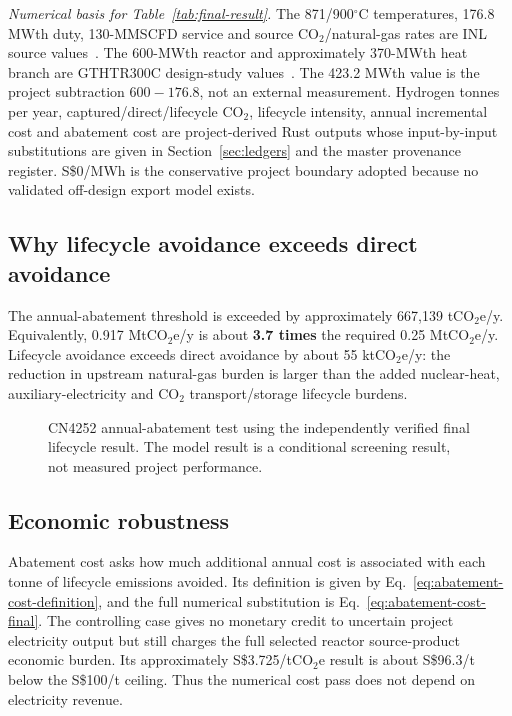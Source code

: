 \noindent\textit{Numerical basis for Table~\ref{tab:final-result}.} The 871/900$^\circ$C temperatures, 176.8 MWth duty, 130-MMSCFD service and source CO$_2$/natural-gas rates are INL source values~\cite{inltev953,inltev961}. The 600-MWth reactor and approximately 370-MWth heat branch are GTHTR300C design-study values~\cite{nishihara2007potential}. The 423.2 MWth value is the project subtraction $600-176.8$, not an external measurement. Hydrogen tonnes per year, captured/direct/lifecycle CO$_2$, lifecycle intensity, annual incremental cost and abatement cost are project-derived Rust outputs whose input-by-input substitutions are given in Section~\ref{sec:ledgers} and the master provenance register. S\$0/MWh is the conservative project boundary adopted because no validated off-design export model exists.

\subsection{Why lifecycle avoidance exceeds direct avoidance}
The annual-abatement threshold is exceeded by approximately 667,139 tCO$_2$e/y. Equivalently, 0.917 MtCO$_2$e/y is about \textbf{3.7 times} the required 0.25 MtCO$_2$e/y. Lifecycle avoidance exceeds direct avoidance by about 55 ktCO$_2$e/y: the reduction in upstream natural-gas burden is larger than the added nuclear-heat, auxiliary-electricity and CO$_2$ transport/storage lifecycle burdens.

\begin{figure}[htbp]\centering
{}
\caption{CN4252 annual-abatement test using the independently verified final lifecycle result. The model result is a conditional screening result, not measured project performance.}
\label{fig:abatement-threshold}
\end{figure}

\subsection{Economic robustness}
Abatement cost asks how much additional annual cost is associated with each tonne of lifecycle emissions avoided. Its definition is given by Eq.~\ref{eq:abatement-cost-definition}, and the full numerical substitution is Eq.~\ref{eq:abatement-cost-final}.
The controlling case gives no monetary credit to uncertain project electricity output but still charges the full selected reactor source-product economic burden. Its approximately S\$3.725/tCO$_2$e result is about S\$96.3/t below the S\$100/t ceiling. Thus the numerical cost pass does not depend on electricity revenue.

